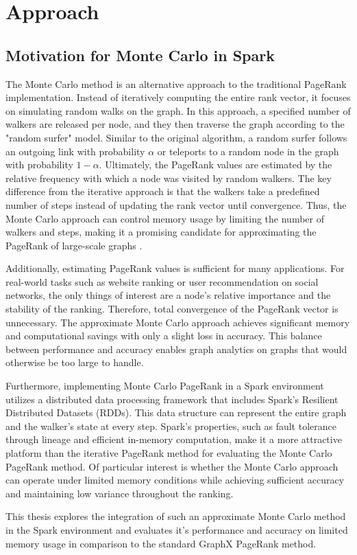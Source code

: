\section{Approach}
\subsection{Motivation for Monte Carlo in Spark}
The Monte Carlo method is an alternative approach to the traditional PageRank implementation. Instead of iteratively computing the entire rank vector, it focuses on simulating random walks on the graph. In this approach, a specified number of walkers are released per node, and they then traverse the graph according to the "random surfer" model. Similar to the original algorithm, a random surfer follows an outgoing link with probability $\alpha$ or teleports to a random node in the graph with probability $1-\alpha$. Ultimately, the PageRank values are estimated by the relative frequency with which a node was visited by random walkers. The key difference from the iterative approach is that the walkers take a predefined number of steps instead of updating the rank vector until convergence. Thus, the Monte Carlo approach can control memory usage by limiting the number of walkers and steps, making it a promising candidate for approximating the PageRank of large-scale graphs \cite{avrachenkov_monte_2007}. \par
Additionally, estimating PageRank values is sufficient for many applications. For real-world tasks such as website ranking or user recommendation on social networks, the only things of interest are a node's relative importance and the stability of the ranking. Therefore, total convergence of the PageRank vector is unnecessary. The approximate Monte Carlo approach achieves significant memory and computational savings with only a slight loss in accuracy. This balance between performance and accuracy enables graph analytics on graphs that would otherwise be too large to handle.\par
Furthermore, implementing Monte Carlo PageRank in a Spark environment utilizes a distributed data processing framework that includes Spark's Resilient Distributed \allowbreak Datasets (RDDs). This data structure can represent the entire graph and the walker's state at every step. Spark's properties, such as fault tolerance through lineage and efficient in-memory computation, make it a more attractive platform than the iterative PageRank method for evaluating the Monte Carlo PageRank method. Of particular interest is whether the Monte Carlo approach can operate under limited memory conditions while achieving sufficient accuracy and maintaining low variance throughout the ranking. \par
This thesis explores the integration of such an approximate Monte Carlo method in the Spark environment and evaluates it's performance and accuracy on limited memory usage in comparison to the standard GraphX PageRank method.
 

